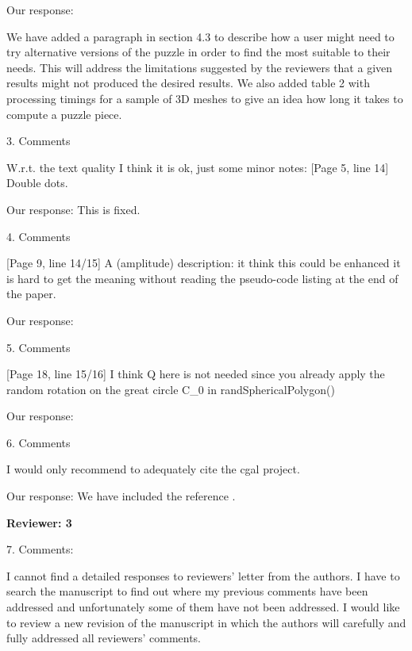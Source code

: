 \documentclass[acmlarge,screen,dvipsnames]{acmart}
\begin{document}
\greenBegin

Our response:

We have added a paragraph in section 4.3 to describe how a user might need to try alternative versions of the puzzle in order to find the most suitable to their needs. This will address the limitations suggested by the reviewers that a given results might not produced the desired results. We also added table 2 with processing timings for a sample of 3D meshes to give an idea how long it takes to compute a puzzle piece.


\greenEnd


3. Comments

W.r.t. the text quality I think it is ok, just some minor notes:
[Page 5,  line 14] Double dots.

\greenBegin

Our response: This is fixed.

\greenEnd


4. Comments


[Page 9,  line 14/15] A (amplitude) description: it think this could be enhanced it is hard to get the meaning without reading the pseudo-code listing at the end of the paper. 

\greenBegin

Our response: 

\greenEnd

5. Comments

[Page 18, line 15/16] I think Q here is not needed since you already apply the random rotation on the great circle C\_0 in randSphericalPolygon() 

\greenBegin

Our response: 

\greenEnd


6. Comments

I would only recommend to adequately cite the cgal project. 

\greenBegin

Our response: We have included the reference \cite{cgal:eb-14a}.

\greenEnd

\textbf{Reviewer: 3}


7. Comments:


I cannot find a detailed responses to reviewers' letter from the authors. I have to search the manuscript to find out where my previous comments have been addressed and unfortunately some of them have not been addressed. I would like to review a new revision of the manuscript in which the authors will carefully and fully addressed all reviewers' comments. 
\end{document}
